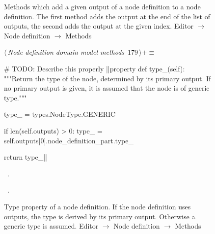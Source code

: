 \documentclass[%
    a4paper,    %
    justified,  %
    nobib,      %
    openany     %
]{tufte-book}
\makeatletter
\renewcommand{\label}[1]{\@tufte@label{##1}}%
\makeatother
\begin{document}
\begin{figure}[!htbp]
\begin{flushleft}
\begin{minipage}{\linewidth}
\begin{list}{}{\setlength{\itemsep}{-\parsep}\setlength{\itemindent}{-\leftmargin}}
\item{}
\end{list}
\end{minipage}\vspace{4ex}
\end{flushleft}
\caption{Methods which add a given output of a node definition to a node
  definition. The first method adds the output at the end of the list of
  outputs, the second adds the output at the given index.
  \newline{}\newline{}Editor $\rightarrow$ Node definition $\rightarrow$
  Methods}
\end{figure}

\begin{figure}[!htbp]
\begin{flushleft} \small
\begin{minipage}{\linewidth}\label{scrap150}\raggedright\small
{} $\langle\,${\itshape Node definition domain model methods}\nobreak\ {\footnotesize {179}}$\,\rangle+\equiv$
\vspace{-1ex}
\begin{pythoncode}
# TODO: Describe this properly
|\normalfont{}\fontfamily{}|property
def type_(self):
    """Return the type of the node, determined by its primary
    output. If no primary output is given, it is assumed that
    the node is of generic type."""

    type_ = types.NodeType.GENERIC

    if len(self.outputs) > 0:
        type_ = self.outputs[0].node_definition_part.type_

    return type_|\NWsep|
\end{pythoncode}
\vspace{1.5ex}
\footnotesize
\begin{list}{}{\setlength{\itemsep}{-\parsep}\setlength{\itemindent}{-\leftmargin}}
\item \NWtxtMacroDefBy\ .
\item \NWtxtMacroRefIn\ .

\item{}
\end{list}
\end{minipage}\vspace{4ex}
\end{flushleft}
\caption{Type property of a node definition. If the node definition uses
  outputs, the type is derived by its primary output. Otherwise a generic type
  is assumed.
  \newline{}\newline{}Editor $\rightarrow$ Node definition $\rightarrow$
  Methods}
\end{figure}
\end{document}
